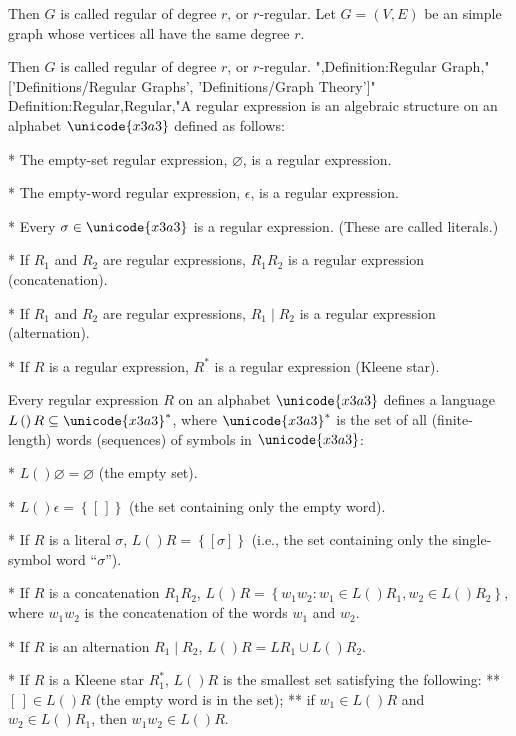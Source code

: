 Then $G$ is called regular of degree $r$, or $r$-regular.
Let $G = \left( V, E \right)$ be an simple graph whose vertices all have the same degree $r$.

Then $G$ is called regular of degree $r$, or $r$-regular.
",Definition:Regular Graph,"['Definitions/Regular Graphs', 'Definitions/Graph Theory']"
Definition:Regular,Regular,"A regular expression is an algebraic structure on an alphabet $\unicode{x3a3}$ defined as follows:

* The empty-set regular expression, $\varnothing$, is a regular expression.

* The empty-word regular expression, $\epsilon$, is a regular expression.

* Every $\sigma \in \unicode{x3a3}$ is a regular expression. (These are called literals.)

* If $R_1$ and $R_2$ are regular expressions, $R_1 R_2$ is a regular expression (concatenation).

* If $R_1$ and $R_2$ are regular expressions, $R_1 \mid R_2$ is a regular expression (alternation).

* If $R$ is a regular expression, $R^*$ is a regular expression (Kleene star).


Every regular expression $R$ on an alphabet $\unicode{x3a3}$ defines a language $L \left(   \right)R \subseteq \unicode{x3a3}^*$, where $\unicode{x3a3}^*$ is the set of all (finite-length) words (sequences) of symbols in $\unicode{x3a3}$:

* $L \left(   \right)\varnothing = \varnothing$ (the empty set).

* $L \left(   \right)\epsilon = \left\lbrace \left[ \, \right] \right\rbrace$ (the set containing only the empty word).

* If $R$ is a literal $\sigma$, $L \left(   \right)R = \left\lbrace \left[ \sigma \right] \right\rbrace$ (i.e., the set containing only the single-symbol word “$\sigma$”).

* If $R$ is a concatenation $R_1 R_2$, $L \left(   \right)R = \left\lbrace w_1 w_2: w_1 \in L \left(   \right){R_1}, w_2 \in L \left(   \right){R_2}  \right\rbrace$, where $w_1 w_2$ is the concatenation of the words $w_1$ and $w_2$.

* If $R$ is an alternation $R_1 \mid R_2$, $L \left(   \right)R = L {R_1} \cup L \left(   \right){R_2}$.

* If $R$ is a Kleene star $R_1^*$, $L \left(   \right)R$ is the smallest set satisfying the following:
** $\left[ \, \right] \in L \left(   \right)R$ (the empty word is in the set);
** if $w_1 \in L \left(   \right)R$ and $w_2 \in L \left(   \right){R_1}$, then $w_1 w_2 \in L \left(   \right)R$.

